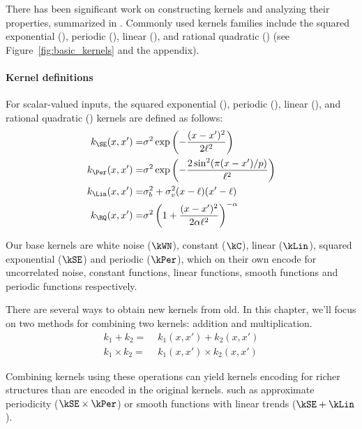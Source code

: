 There has been significant work on constructing \gp{} kernels and analyzing their properties, summarized in \cite[Chapter~4]{rasmussen38gaussian}. 
%
Commonly used kernels families include the squared exponential (\kSE), periodic (\kPer), linear (\kLin), and rational quadratic (\kRQ) (see Figure~\ref{fig:basic_kernels} and the appendix).
%

\paragraph{Kernel definitions}
For scalar-valued inputs, the squared exponential (\kSE), periodic (\kPer), linear (\kLin), and rational quadratic (\kRQ) kernels are defined as follows:
%
\begin{eqnarray*}
\kernel_{\SE}(\inputVar, \inputVar') =& \sigma^2\exp\left(-\frac{(\inputVar - \inputVar')^2}{2\ell^2}\right) \\
\kernel_{\Per}(\inputVar, \inputVar') =& \sigma^2\exp\left(-\frac{2\sin^2 (\pi(\inputVar - \inputVar')/p)}{\ell^2}\right) \\
\kernel_{\Lin}(\inputVar, \inputVar') =& \sigma_b^2 + \sigma_v^2(\inputVar - \ell)(\inputVar' - \ell) \\
\kernel_{\RQ}(\inputVar, \inputVar') =& \sigma^2\left( 1 + \frac{(\inputVar - \inputVar')^2}{2 \alpha \ell^2} \right)^{-\alpha}
\end{eqnarray*}



Our base kernels are white noise ($\kWN$), constant ($\kC$), linear ($\kLin$), squared exponential ($\kSE$) and periodic ($\kPer$), which on their own encode for uncorrelated noise, constant functions, linear functions, smooth functions and periodic functions respectively.

There are several ways to obtain new kernels from old. %
In this chapter, we'll focus on two methods for combining two kernels: addition and multiplication.
\begin{align}
k_1 + k_2 =& \,\, k_1(x,x') + k_2(x,x')\\
k_1 \times k_2 =& \,\, k_1(x,x') \times k_2(x,x')
\end{align}

Combining kernels using these operations can yield kernels encoding for richer structures than are encoded in the original kernels.
 such as approximate periodicity ($\kSE \times \kPer$) or smooth functions with linear trends ($\kSE + \kLin$).

